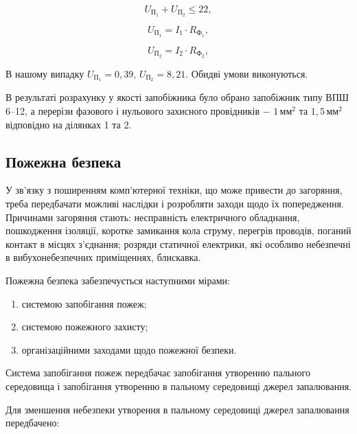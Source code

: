 \begin{equation}\label{eq:work15}
	U_{\text{П}_{1}} + U_{\text{П}_{2}} \le 22,
\end{equation}

\begin{equation}\label{eq:work16}
	U_{\text{П}_{1}} = I_{1} \cdot R_{\text{Ф}_{1}},
\end{equation}

\begin{equation}\label{eq:work17}
	U_{\text{П}_{2}} = I_{2} \cdot R_{\text{Ф}_{2}},
\end{equation}

\vspace{1.5em}

В нашому випадку $U_{\text{П}_{1}} = 0,39, \, U_{\text{П}_{2}} = 8,21.$ Обидві умови виконуються.

В результаті розрахунку у якості запобіжника було обрано запобіжник типу ВПШ 6–12, а перерізи фазового і нульового захисного провідників $-$ $1 \, \text{мм}^{2}$ та $1,5 \, \text{мм}^{2}$ відповідно на ділянках 1 та 2.

\subsection{Пожежна безпека}

У зв’язку з поширенням комп’ютерної техніки, що може привести до загоряння, треба передбачати можливі наслідки і розробляти заходи щодо їх попередження. Причинами загоряння стають: несправність електричного обладнання, пошкодження ізоляції, коротке замикання кола струму, перегрів проводів, поганий контакт в місцях з’єднання; розряди статичної електрики, які особливо небезпечні в вибухонебезпечних приміщеннях, блискавка.

Пожежна безпека забезпечується наступними мірами:

\begin{enumerate}
	\item системою запобігання пожеж;
	\item системою пожежного захисту;
	\item організаційними заходами щодо пожежної безпеки.
\end{enumerate}

Система запобігання пожеж передбачає запобігання утворенню пального середовища і запобігання утворенню в пальному середовищі джерел запалювання.

Для зменшення небезпеки утворення в пальному середовищі джерел запалювання передбачено:

